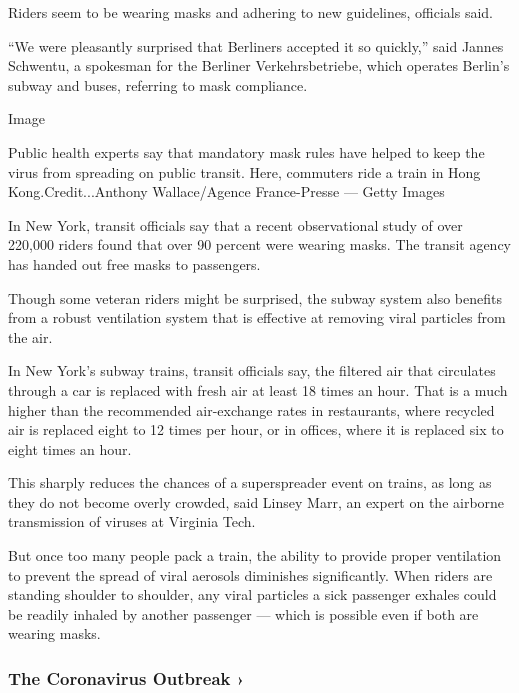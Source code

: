 Riders seem to be wearing masks and adhering to new guidelines,
officials said.

``We were pleasantly surprised that Berliners accepted it so quickly,''
said Jannes Schwentu, a spokesman for the Berliner Verkehrsbetriebe,
which operates Berlin's subway and buses, referring to mask compliance.

Image

Public health experts say that mandatory mask rules have helped to keep
the virus from spreading on public transit. Here, commuters ride a train
in Hong Kong.Credit...Anthony Wallace/Agence France-Presse --- Getty
Images

In New York, transit officials say that a recent observational study of
over 220,000 riders found that over 90 percent were wearing masks. The
transit agency has handed out free masks to passengers.

Though some veteran riders might be surprised, the subway system also
benefits from a robust ventilation system that is effective at removing
viral particles from the air.

In New York's subway trains, transit officials say, the filtered air
that circulates through a car is replaced with fresh air at least 18
times an hour. That is a much higher than the recommended air-exchange
rates in restaurants, where recycled air is replaced eight to 12 times
per hour, or in offices, where it is replaced six to eight times an
hour.

This sharply reduces the chances of a superspreader event on trains, as
long as they do not become overly crowded, said Linsey Marr, an expert
on the airborne transmission of viruses at Virginia Tech.

But once too many people pack a train, the ability to provide proper
ventilation to prevent the spread of viral aerosols diminishes
significantly. When riders are standing shoulder to shoulder, any viral
particles a sick passenger exhales could be readily inhaled by another
passenger --- which is possible even if both are wearing masks.

\href{https://www.nytimes.com/news-event/coronavirus?action=click\&pgtype=Article\&state=default\&region=MAIN_CONTENT_3\&context=storylines_faq}{}

\hypertarget{the-coronavirus-outbreak-}{%
\subsubsection{The Coronavirus Outbreak
›}\label{the-coronavirus-outbreak-}}

